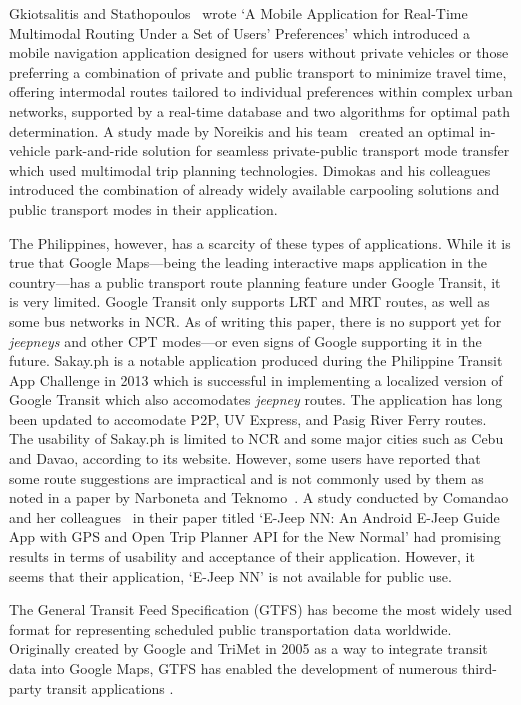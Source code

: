 \documentclass[journal]{./IEEE/IEEEtran}
\begin{document}
Gkiotsalitis and Stathopoulos~\cite{Gkiotsalitis15} wrote `A Mobile Application for Real-Time Multimodal Routing Under a Set of Users’ Preferences' which introduced a mobile navigation application designed for users without private vehicles or those preferring a combination of private and public transport to minimize travel time, offering intermodal routes tailored to individual preferences within complex urban networks, supported by a real-time database and two algorithms for optimal path determination.
A study made by Noreikis and his team~\cite{Noreikis14} created an optimal in-vehicle park-and-ride solution for seamless private-public transport mode transfer which used multimodal trip planning technologies.
Dimokas and his colleagues~\cite{Dimokas18} introduced the combination of already widely available carpooling solutions and public transport modes in their application.

The Philippines, however, has a scarcity of these types of applications. While it is true that Google Maps---being the leading interactive maps application in the country---has a public transport route planning feature under Google Transit, it is very limited.
Google Transit only supports LRT and MRT routes, as well as some bus networks in NCR\@.
As of writing this paper, there is no support yet for \textit{jeepneys} and other CPT modes---or even signs of Google supporting it in the future.
Sakay.ph is a notable application produced during the Philippine Transit App Challenge in 2013 which is successful in implementing a localized version of Google Transit which also accomodates \textit{jeepney} routes.
The application has long been updated to accomodate P2P, UV Express, and Pasig River Ferry routes. The usability of Sakay.ph is limited to NCR and some major cities such as Cebu and Davao, according to its website. However, some users have reported that some route suggestions are impractical and is not commonly used by them as noted in a paper by Narboneta and Teknomo~\cite{Narboneta15}.
A study conducted by Comandao and her colleagues~\cite{Comandao21} in their paper titled `E-Jeep NN\@: An Android E-Jeep Guide App with GPS and Open Trip Planner API for the New Normal' had promising results in terms of usability and acceptance of their application.
However, it seems that their application, `E-Jeep NN' is not available for public use.

The General Transit Feed Specification (GTFS) has become the most widely used format for representing scheduled public transportation data worldwide.
Originally created by Google and TriMet in 2005 as a way to integrate transit data into Google Maps, GTFS has enabled the development of numerous third-party transit applications \cite{Antrim01}.
\end{document}
